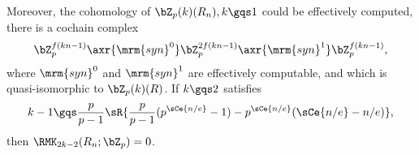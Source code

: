 \documentclass[article, a4paper, twoside]{universal}
\begin{document}
Moreover, the cohomology of $\bZ_{p}(k)(R_{n}),k\gqs1$ could be effectively computed, there is a cochain complex
\[
    \bZ_{p}^{f(kn-1)}\axr{\mrm{syn}^{0}}\bZ_{p}^{2f(kn-1)}\axr{\mrm{syn}^{1}}\bZ_{p}^{f(kn-1)},
\]
where $\mrm{syn}^{0}$ and $\mrm{syn}^{1}$ are effectively computable, and which is quasi-isomorphic to $\bZ_{p}(k)(R)$. If $k\gqs2$ satisfies
\[
    k-1\gqs\frac{p}{p-1}\sR{\frac{p}{p-1}(p^{\sCe{n/e}}-1)-p^{\sCe{n/e}}(\sCe{n/e}-n/e)},
\]
then $\RMK_{2k-2}(R_{n};\bZ_{p})=0$.



\printref
\end{document}
